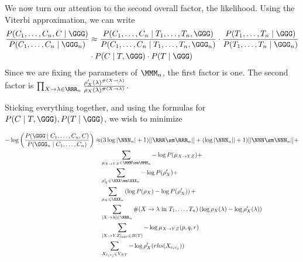We now turn our attention to the second overall factor, the
likelihood.  Using the Viterbi approximation, we can write
\begin{align*}
\frac{P(C_1,\dots,C_n, C\mid \GGG)}{P(C_1,\dots,C_n \mid \GGG_n)}
& \approx
\frac{P(C_1,\dots,C_n \mid T_1,\dots, T_n, \GGG)}{P(C_1,\dots,C_n \mid T_1,\dots, T_n, \GGG_n)}
\cdot
\frac{P(T_1,\dots,T_n \mid  \GGG)}{P(T_1,\dots,T_n \mid  \GGG_n)} \\
& 
\cdot
P(C\mid T, \GGG)
\cdot
P(T\mid \GGG)
\end{align*}
Since we are fixing the parameters of $\MMM_n$, the first factor is
one. The second factor is $\prod_{X\to \lambda\in \RRR_n}
\frac{\rho'_X(\lambda)^{\#(X\to \lambda)}}{\rho_X(\lambda)^{\#(X\to
    \lambda)}}$.

Sticking everything together, and using the formulas for $P(C\mid T,
\GGG), P(T\mid \GGG)$, we wish to minimize

\begin{align*}
-\log\left(
\frac{P(\GGG \mid C_1, \dots, C_n, C)}{P(\GGG_n\mid C_1, \dots, C_n)}
\right) 
\approx&
(3 \log |\NNN_n| + 1)[|\RRR \sm \RRR_n|] + 
(\log|\NNN_n|| + 1) [|\NNN \sm \NNN_n|] + \\
& \sum_{\mu_{X\to YZ}\in \MMM\sm \MMM_n} -\log P(\mu_{X\to YZ}) +\\
& \sum_{\rho'_X\in \XXX \sm \XXX_n} -\log P(\rho'_X) +\\
& \sum_{\rho_X \in \XXX_n} \left(\log P(\rho_X) -\log P(\rho'_X)\right) + \\
& \sum_{[X\to \lambda]\in \RRR_n} \#(X\to \lambda\text{ in } T_1,\dots,T_n)
\left( \log \rho_X(\lambda) - \log \rho'_X(\lambda) \right) \\
& \sum_{[X\to YZ]_{pqr}\in R(T)} -\log \mu_{X\to YZ}(p,q,r) \\
& \sum_{X_{c_i c_j}\in V_{NT}} -\log\rho'_{X}(rhs(X_{c_i c_j}))
\end{align*}

